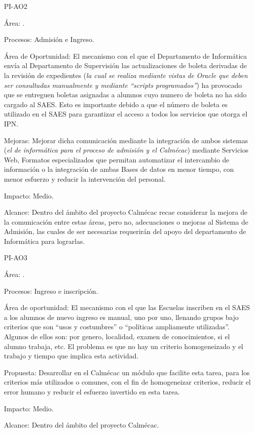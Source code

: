 \begin{AreaOportunidad}{PI-AO2}
	\item[Área:] .
	\item[Procesos:] Admisión e Ingreso.
	\item[Área de Oportunidad:] El mecanismo con el que el Departamento de Informática envía al Departamento de Supervisión las actualizaciones de boleta derivadas de la revisión de expedientes ({\em la cual se realiza mediante vistas de Oracle que deben ser consultadas manualmente y mediante ``scripts programados''}) ha provocado que se entreguen boletas asignadas a alumnos cuyo numero de boleta no ha sido cargado al SAES. Esto es importante debido a que el número de boleta es utilizado en el SAES para garantizar el acceso a todos los servicios que otorga el IPN.
	\item[Mejoras:] Mejorar dicha comunicación mediante la integración de ambos sistemas ({\em el de informática para el proceso de admisión y el Calmécac}) mediante Servicios Web, Formatos especializados que permitan automatizar el intercambio de información o la integración de ambas Bases de datos en menor tiempo, con menor esfuerzo y reducir la intervención del personal.
	\item[Impacto:] Medio.
	\item[Alcance:] Dentro del ámbito del proyecto Calmécac recae considerar la mejora de la comunicación entre estas áreas, pero no, adecuaciones o mejoras al Sistema de Admisión, las cuales de ser necesarias requerirán del apoyo del departamento de Informática para lograrlas.
\end{AreaOportunidad}

\begin{AreaOportunidad}{PI-AO3}
	\item[Área:] .
	\item[Procesos:] Ingreso e inscripción.
	\item[Área de oportunidad:] El mecanismo con el que las Escuelas inscriben en el SAES a los alumnos de nuevo ingreso es manual, uno por uno, llenando grupos bajo criterios que son ``usos y costumbres'' o ``políticas ampliamente utilizadas''. Algunos de ellos son: por genero, localidad, examen de conocimientos, si el alumno trabaja, etc. El problema es que no hay un criterio homogeneizado y el trabajo y tiempo que implica esta actividad.
	\item[Propuesta:] Desarrollar en el Calmécac un módulo que facilite esta tarea, para los criterios más utilizados o comunes, con el fin de homogeneizar criterios, reducir el error humano y reducir el esfuerzo invertido en esta tarea.
	\item[Impacto:] Medio.
	\item[Alcance:] Dentro del ámbito del proyecto Calmécac.
\end{AreaOportunidad}

